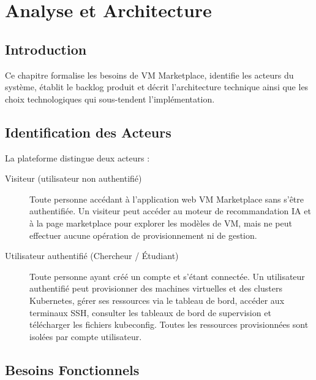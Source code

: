 \chapter{Analyse et Architecture}

\section{Introduction}

Ce chapitre formalise les besoins de VM Marketplace, identifie les acteurs du système,
établit le backlog produit et décrit l'architecture technique ainsi que les choix
technologiques qui sous-tendent l'implémentation.

\section{Identification des Acteurs}

La plateforme distingue deux acteurs :

\begin{description}
  \item[Visiteur (utilisateur non authentifié)] Toute personne accédant à l'application
        web VM Marketplace sans s'être authentifiée. Un visiteur peut accéder au moteur
        de recommandation IA et à la page marketplace pour explorer les modèles de VM,
        mais ne peut effectuer aucune opération de provisionnement ni de gestion.

  \item[Utilisateur authentifié (Chercheur / Étudiant)] Toute personne ayant créé un
        compte et s'étant connectée. Un utilisateur authentifié peut provisionner des
        machines virtuelles et des clusters Kubernetes, gérer ses ressources via le
        tableau de bord, accéder aux terminaux SSH, consulter les tableaux de bord de
        supervision et télécharger les fichiers kubeconfig. Toutes les ressources
        provisionnées sont isolées par compte utilisateur.
\end{description}

\section{Besoins Fonctionnels}

